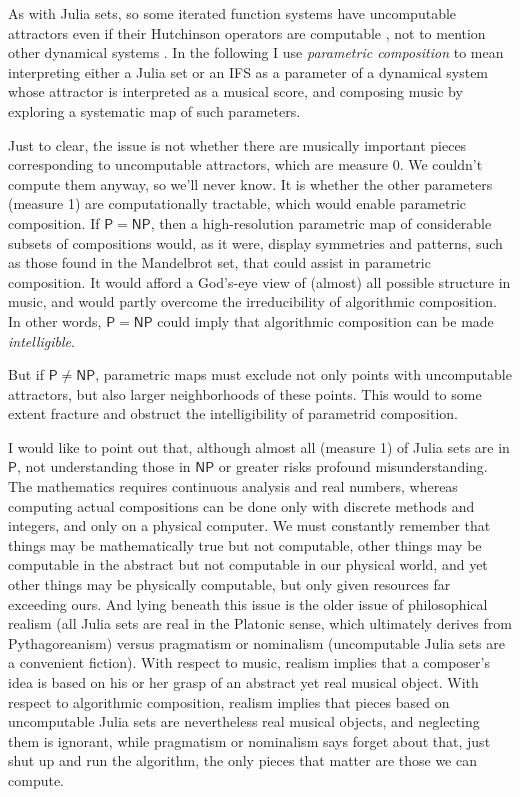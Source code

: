 \documentclass[11pt,papersize=a4]{scrartcl}
\begin{document}
As with Julia sets,  so some iterated function systems have uncomputable attractors even if their Hutchinson operators are computable \parencite{dube1993undecidable}, not to mention other dynamical systems \parencite{cotler2024computational}. In the following I use \emph{parametric composition} to mean interpreting either a Julia set or an IFS as a parameter of a dynamical system whose attractor is interpreted as a musical score, and composing music by exploring a systematic map of such parameters.

Just to clear, the issue is not whether there are musically important pieces corresponding to uncomputable attractors, which are measure 0. We couldn't compute them anyway, so we'll never know. It is whether the other parameters (measure 1) are computationally tractable, which would enable parametric composition. 
If $\mathsf{P} = \mathsf{NP}$, then a high-resolution parametric map of considerable subsets of compositions would, as it were, display symmetries and patterns, such as those found in the Mandelbrot set, that could assist in parametric composition. It would afford a God's-eye view of (almost) all possible structure in music, and would partly overcome the irreducibility of algorithmic composition. In other words, $\mathsf{P} = \mathsf{NP}$ could imply that algorithmic composition can be made \emph{intelligible}.

But if $\mathsf{P} \ne \mathsf{NP}$, parametric maps must exclude not only points with uncomputable attractors, but also larger neighborhoods of these points. This would to some extent fracture and obstruct the intelligibility of parametrid composition.

I would like to point out that, although almost all (measure 1) of Julia sets are in $\mathsf{P}$, not understanding those in $\mathsf{NP}$ or greater risks profound misunderstanding. The mathematics requires continuous analysis and real numbers, whereas computing actual compositions can be done only with discrete methods and integers, and only on a physical computer. We must constantly remember that things may be mathematically true but not computable, other things may be computable in the abstract but not computable in our physical world, and yet other things may be physically computable, but only given resources far exceeding ours. And lying beneath this issue is the older issue of philosophical realism (all Julia sets are real in the Platonic sense, which ultimately derives from Pythagoreanism) versus pragmatism or nominalism (uncomputable Julia sets are a convenient fiction). With respect to music, realism implies that a composer's idea is based on his or her grasp of an abstract yet real musical object. With respect to algorithmic composition, realism implies that pieces based on uncomputable Julia sets are nevertheless real musical objects, and neglecting them is ignorant, while pragmatism or nominalism says forget about that, just shut up and run the algorithm, the only pieces that matter are those we can compute.
\end{document}
